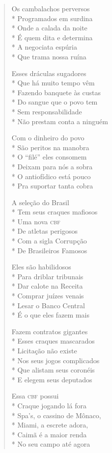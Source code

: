 \begin{verse}
Os cambalachos perversos\\*
Programados em surdina\\*
Onde a calada da noite\\*
É quem dita e determina\\*
A negociata espúria\\*
Que trama nossa ruína

Esses dráculas sugadores\\*
Que há muito tempo vêm\\*
Fazendo banquete às custas\\*
Do sangue que o povo tem\\*
Sem responsabilidade\\*
Não prestam conta a ninguém

Com o dinheiro do povo\\*
São peritos na manobra\\*
O “filé” eles consomem\\*
Deixam para nós a sobra\\*
O antiofídico está pouco\\*
Pra suportar tanta cobra

A seleção do Brasil\\*
Tem seus craques mafiosos\\*
Uma nova \textsc{cbf}\\*
De atletas perigosos\\*
Com a sigla Corrupção\\*
De Brasileiros Famosos

Eles são habilidosos\\*
Para driblar tribunais\\*
Dar calote na Receita\\*
Comprar juízes venais\\*
Lesar o Banco Central\\*
É o que eles fazem mais

Fazem contratos gigantes\\*
Esses craques mascarados\\*
Licitação não existe\\*
Nos seus jogos complicados\\*
Que alistam seus coronéis\\*
E elegem seus deputados

Essa \textsc{cbf} possui\\*
Craque jogando lá fora\\*
Spa's, o cassino de Mônaco,\\*
Miami, a escrete adora,\\*
Caimã é a maior renda\\*
No seu campo até agora


\end{verse}
